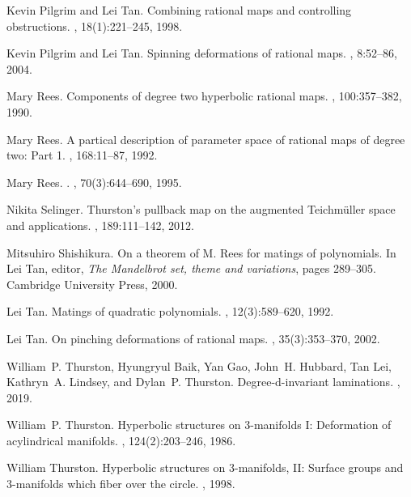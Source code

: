 \documentclass[11pt, reqno]{amsart}
\numberwithin{equation}{section}
\theoremstyle{plain}
\theoremstyle{theorem}
\theoremstyle{definition}
\numberwithin{figure}{section}
\begin{document}
\begin{thebibliography}{DPWY20}
Kevin Pilgrim and Lei Tan.
\newblock Combining rational maps and controlling obstructions.
, 18(1):221–245, 1998.

Kevin Pilgrim and Lei Tan.
\newblock Spinning deformations of rational maps.
, 8:52--86, 2004.

Mary Rees.
\newblock Components of degree two hyperbolic rational maps.
, 100:357--382, 1990.

Mary Rees.
\newblock A partical description of parameter space of rational maps of degree
  two: Part 1.
, 168:11--87, 1992.

Mary Rees.
.
,
 70(3):644--690, 1995.

Nikita Selinger.
\newblock Thurston's pullback map on the augmented Teichm\"uller space and
  applications.
, 189:111--142, 2012.

Mitsuhiro Shishikura.
\newblock On a theorem of {M. Rees} for matings of polynomials.
\newblock In Lei Tan, editor, {\em The {Mandelbrot} set, theme and variations},
  pages 289--305. Cambridge University Press, 2000.

Lei Tan.
\newblock Matings of quadratic polynomials.
, 12(3):589--620, 1992.

Lei Tan.
\newblock On pinching deformations of rational maps.
, 35(3):353--370, 2002.

William~P. Thurston, Hyungryul Baik, Yan Gao, John~H. Hubbard, Tan Lei,
  Kathryn~A. Lindsey, and Dylan~P. Thurston.
\newblock Degree-d-invariant laminations.
, 2019.

William~P. Thurston.
\newblock Hyperbolic structures on 3-manifolds {I}: Deformation of acylindrical
  manifolds.
, 124(2):203--246, 1986.

William Thurston.
\newblock Hyperbolic structures on 3-manifolds, {II}: Surface groups and
  3-manifolds which fiber over the circle.
, 1998.


\end{thebibliography}
\end{document}
